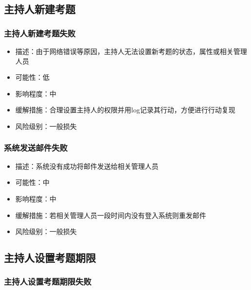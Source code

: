 \documentclass[hyperref, a4paper]{ctexart}
\providecommand{\tightlist}{%
  \setlength{\itemsep}{0pt}\setlength{\parskip}{0pt}}
\begin{document}
\hypertarget{ux4e3bux6301ux4ebaux65b0ux5efaux8003ux9898-1}{%
\subsection{主持人新建考题}\label{ux4e3bux6301ux4ebaux65b0ux5efaux8003ux9898-1}}

\hypertarget{ux4e3bux6301ux4ebaux65b0ux5efaux8003ux9898ux5931ux8d25}{%
\subsubsection{主持人新建考题失败}\label{ux4e3bux6301ux4ebaux65b0ux5efaux8003ux9898ux5931ux8d25}}

\begin{itemize}
\tightlist
\item
  描述：由于网络错误等原因，主持人无法设置新考题的状态，属性或相关管理人员
\item
  可能性：低
\item
  影响程度：中
\item
  缓解措施：合理设置主持人的权限并用log记录其行动，方便进行行动复现
\item
  风险级别：一般损失
\end{itemize}

\hypertarget{ux7cfbux7edfux53d1ux9001ux90aeux4ef6ux5931ux8d25}{%
\subsubsection{系统发送邮件失败}\label{ux7cfbux7edfux53d1ux9001ux90aeux4ef6ux5931ux8d25}}

\begin{itemize}
\tightlist
\item
  描述：系统没有成功将邮件发送给相关管理人员
\item
  可能性：中
\item
  影响程度：中
\item
  缓解措施：若相关管理人员一段时间内没有登入系统则重发邮件
\item
  风险级别：一般损失
\end{itemize}

\hypertarget{ux4e3bux6301ux4ebaux8bbeux7f6eux8003ux9898ux671fux9650-1}{%
\subsection{主持人设置考题期限}\label{ux4e3bux6301ux4ebaux8bbeux7f6eux8003ux9898ux671fux9650-1}}

\hypertarget{ux4e3bux6301ux4ebaux8bbeux7f6eux8003ux9898ux671fux9650ux5931ux8d25}{%
\subsubsection{主持人设置考题期限失败}\label{ux4e3bux6301ux4ebaux8bbeux7f6eux8003ux9898ux671fux9650ux5931ux8d25}}
\end{document}
